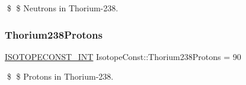 \$ \$ Neutrons in Thorium-\/238. \mbox{\label{group___isotope_const-_thorium-_th238_gaaddeca81c879c6eeee7344032a5b90b5}} 
\subsubsection{\texorpdfstring{Thorium238\+Protons}{Thorium238Protons}}
{\footnotesize\ttfamily \mbox{\hyperlink{group___isotope_const-_macros_ga5f18360b3e99483a35c32d789e62621c}{I\+S\+O\+T\+O\+P\+E\+C\+O\+N\+S\+T\+\_\+\+I\+NT}} Isotope\+Const\+::\+Thorium238\+Protons = 90}

\$ \$ Protons in Thorium-\/238. 